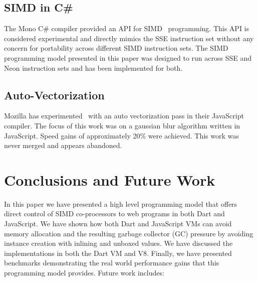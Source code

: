 \documentclass[preprint]{sigplanconf}
\begin{document}
\subsection{SIMD in C\#}

The Mono C\# compiler provided an API for SIMD~\cite{monosimd} programming. This
API is considered experimental and directly mimics the SSE instruction set
without any concern for portability across different SIMD instruction sets. The
SIMD programming model presented in this paper was designed to run across SSE
and Neon instruction sets and has been implemented for both.

\subsection{Auto-Vectorization}

Mozilla has experimented~\cite{mozillasimd} with an auto vectorization pass in
their JavaScript compiler. The focus of this work was on a gaussian blur
algorithm written in JavaScript. Speed gains of approximately 20\% were
achieved. This work was never merged and appears abandoned.

\section{Conclusions and Future Work}

In this paper we have presented a high level programming model that offers
direct control of SIMD co-processors to web programs in both Dart and
JavaScript. We have shown how both Dart and JavaScript VMs can avoid memory
allocation and the resulting garbage collector (GC) pressure by avoiding
instance creation with inlining and unboxed values. We have discussed the
implementations in both the Dart VM and V8. Finally, we have presented
benchmarks demonstrating the real world performance gains that this programming
model provides. Future work includes:
\end{document}

